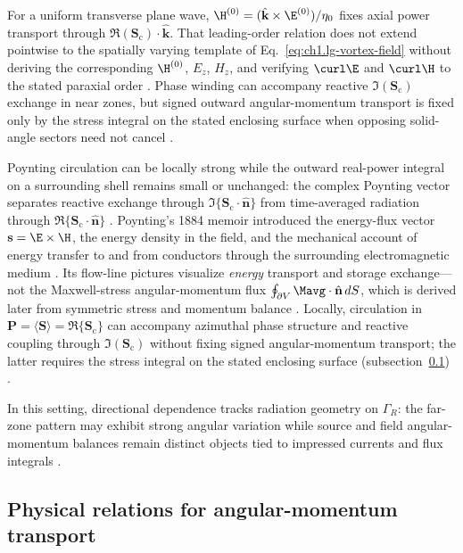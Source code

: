 For a uniform transverse plane wave, $\H^{(0)}=(\hat{\mathbf{k}}\times\E^{(0)})/\eta_0$ fixes axial power transport through $\Re(\mathbf{S}_\mathrm{c})\cdot\hat{\mathbf{k}}$. That leading-order relation does not extend pointwise to the spatially varying template of Eq.~\eqref{eq:ch1.lg-vortex-field} without deriving the corresponding $\H^{(0)}$, $E_z$, $H_z$, and verifying $\curl\E$ and $\curl\H$ to the stated paraxial order \cite{stratton1941,allen1992}. Phase winding can accompany reactive $\Im(\mathbf{S}_\mathrm{c})$ exchange in near zones, but signed outward angular-momentum transport is fixed only by the stress integral on the stated enclosing surface when opposing solid-angle sectors need not cancel \cite{allen1992,poynting1884,stratton1941}.

Poynting circulation can be locally strong while the outward real-power integral on a surrounding shell remains small or unchanged: the complex Poynting vector separates reactive exchange through $\Im\{\mathbf{S}_\mathrm{c}\cdot\hat{\mathbf{n}}\}$ from time-averaged radiation through $\Re\{\mathbf{S}_\mathrm{c}\cdot\hat{\mathbf{n}}\}$ \cite{poynting1884}. Poynting's 1884 memoir introduced the energy-flux vector $\mathbf{s}=\E\times\H$, the energy density in the field, and the mechanical account of energy transfer to and from conductors through the surrounding electromagnetic medium \cite{poynting1884}. Its flow-line pictures visualize \emph{energy} transport and storage exchange---not the Maxwell-stress angular-momentum flux $\oint_{\partial V}\Mavg\cdot\hat{\mathbf{n}}\,dS$, which is derived later from symmetric stress and momentum balance \cite{maxwell1873,stratton1941,beth1936}. Locally, circulation in $\mathbf{P}=\langle\mathbf{S}\rangle=\Re\{\mathbf{S}_\mathrm{c}\}$ can accompany azimuthal phase structure and reactive coupling through $\Im(\mathbf{S}_\mathrm{c})$ without fixing signed angular-momentum transport; the latter requires the stress integral on the stated enclosing surface (subsection~\ref{sec:ch01.2.3}) \cite{stratton1941}.

In this setting, directional dependence tracks radiation geometry on $\Gamma_R$: the far-zone pattern may exhibit strong angular variation while source and field angular-momentum balances remain distinct objects tied to impressed currents and flux integrals \cite{belinfante1940}.
\subsection{Physical relations for angular-momentum transport}
\label{sec:ch01.2.3}

